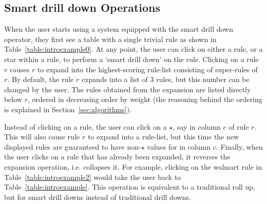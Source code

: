 \documentclass[10pt,journal,compsoc]{IEEEtran}
\newcommand{\papertext}[1]{#1}
\begin{document}
\subsection{Smart drill down Operations}
\label{sec:interface}
When the user starts using a system equipped with
the smart drill down operator, they first see a table with a single trivial rule as shown in Table~\ref{table:introexample0}. At any point, the user can click on either a rule, or a star within a rule, to perform a `smart drill down' on the rule. Clicking on a rule $r$ causes $r$ to expand into the highest-scoring rule-list consisting of super-rules of $r$. By default, the rule $r$ expands into a list of $3$ rules, but this number can be changed by the user.
The rules obtained from the expansion are listed directly below $r$, ordered in decreasing order by weight (the reasoning behind the ordering is explained in Section~\ref{sec:algorithms}).

Instead of clicking on a rule, the user can click on a $\star$, say in column $c$ of rule $r$. This will also cause rule $r$ to expand into a rule-list, but this time the new displayed rules are guaranteed to have non-$\star$ values for in column $c$. 
Finally, when the user clicks on a rule that has already been expanded, it reverses the expansion operation, i.e. collapses it. 
\papertext{ For example, clicking on the walmart rule in Table~\ref{table:introexample2} would take the user back to Table~\ref{table:introexample}. This operation is equivalent to a traditional roll up, but for smart drill downs instead of traditional drill downs.}
\end{document}
